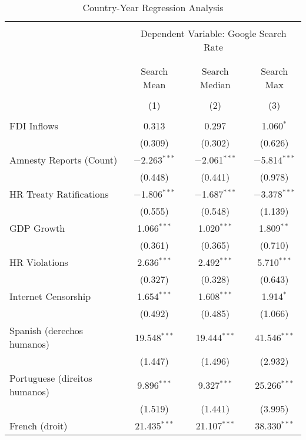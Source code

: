
\begin{table}[!htbp] \centering 
  \caption{Country-Year Regression Analysis} 
  \label{} 
\begin{tabular}{@{\extracolsep{5pt}}lccc} 
\\[-1.8ex]\hline 
\hline \\[-1.8ex] 
 & \multicolumn{3}{c}{Dependent Variable: Google Search Rate} \\ 
\cline{2-4} 
\\[-1.8ex] & \multicolumn{3}{c}{ } \\ 
 & Search Mean & Search Median & Search Max \\ 
\\[-1.8ex] & (1) & (2) & (3)\\ 
\hline \\[-1.8ex] 
 FDI Inflows & 0.313 & 0.297 & 1.060$^{*}$ \\ 
  & (0.309) & (0.302) & (0.626) \\ 
  Amnesty Reports (Count) & $-$2.263$^{***}$ & $-$2.061$^{***}$ & $-$5.814$^{***}$ \\ 
  & (0.448) & (0.441) & (0.978) \\ 
  HR Treaty Ratifications & $-$1.806$^{***}$ & $-$1.687$^{***}$ & $-$3.378$^{***}$ \\ 
  & (0.555) & (0.548) & (1.139) \\ 
  GDP Growth & 1.066$^{***}$ & 1.020$^{***}$ & 1.809$^{**}$ \\ 
  & (0.361) & (0.365) & (0.710) \\ 
  HR Violations & 2.636$^{***}$ & 2.492$^{***}$ & 5.710$^{***}$ \\ 
  & (0.327) & (0.328) & (0.643) \\ 
  Internet Censorship & 1.654$^{***}$ & 1.608$^{***}$ & 1.914$^{*}$ \\ 
  & (0.492) & (0.485) & (1.066) \\ 
  Spanish (derechos humanos) & 19.548$^{***}$ & 19.444$^{***}$ & 41.546$^{***}$ \\ 
  & (1.447) & (1.496) & (2.932) \\ 
  Portuguese (direitos humanos) & 9.896$^{***}$ & 9.327$^{***}$ & 25.266$^{***}$ \\ 
  & (1.519) & (1.441) & (3.995) \\ 
  French (droit) & 21.435$^{***}$ & 21.107$^{***}$ & 38.330$^{***}$ \\ 

\end{tabular}
\end{table}
